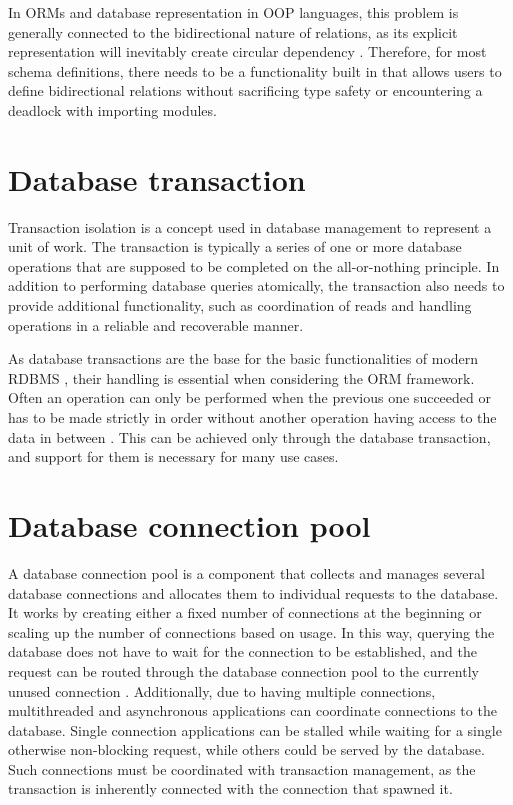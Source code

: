 In ORMs and database representation in OOP languages, this problem is generally
connected to the bidirectional nature of relations, as its explicit
representation will inevitably create circular dependency
\cite{melton-empirical-2007}. Therefore, for most schema definitions, there
needs to be a functionality built in that allows users to define bidirectional
relations without sacrificing type safety or encountering a deadlock with
importing modules. 


\section*{Database transaction}
Transaction isolation is a concept used in database management to represent a
unit of work. The transaction is typically a series of one or more database
operations that are supposed to be completed on the all-or-nothing principle. In
addition to performing database queries atomically, the transaction also needs
to provide additional functionality, such as coordination of reads and handling
operations in a reliable and recoverable manner. 

As database transactions are the base for the basic functionalities of modern
RDBMS \cite{haerder-principles-1983}, their handling is essential when
considering the ORM framework. Often an operation can only be performed when the
previous one succeeded or has to be made strictly in order without another
operation having access to the data in between \cite{postgres-transaction}. This
can be achieved only through the database transaction, and support for them is
necessary for many use cases.


\section*{Database connection pool}
A database connection pool is a component that collects and manages several
database connections and allocates them to individual requests to the database.
It works by creating either a fixed number of connections at the beginning or
scaling up the number of connections based on usage. In this way, querying the
database does not have to wait for the connection to be established, and the
request can be routed through the database connection pool to the currently
unused connection \cite{gupta-improving-2017}. Additionally, due to having
multiple connections, multithreaded and asynchronous applications can coordinate
connections to the database. Single connection applications can be stalled while
waiting for a single otherwise non-blocking request, while others could be
served by the database. Such connections must be coordinated with transaction
management, as the transaction is inherently connected with the connection that
spawned it. 


